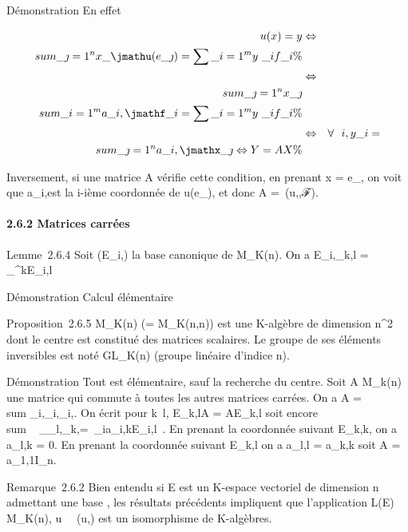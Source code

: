 \documentclass[]{article}
\begin{document}
Démonstration En effet

\begin{align*} u(x) = y&
\Leftrightarrow & \\sum
\_\jmath=1^nx\_ \jmathu(e\_\jmath) =
\sum \_i=1^my~\_
if\_i \%& \\ &
\Leftrightarrow & \\sum
\_\jmath=1^nx\_ \jmath \\sum
\_i=1^ma\_ i,\jmathf\_i =
\sum \_i=1^my~\_
if\_i\%& \\ &
\Leftrightarrow & \forall~~i,
y\_i = \\sum
\_\jmath=1^na\_ i,\jmathx\_\jmath
\Leftrightarrow Y = AX \%&
\\ \end{align*}

Inversement, si une matrice A vérifie cette condition, en prenant x =
e\_\jmath, on voit que a\_i,\jmath est la i-ième coordonnée de
u(e\_\jmath), et donc A =\
\mathrmMat (u,,ℱ).

\paragraph{2.6.2 Matrices carrées}

Lemme~2.6.4 Soit (E\_i,\jmath) la base canonique de M\_K(n).
On a E\_i,\jmathE\_k,l = \delta\_\jmath^kE\_i,l

Démonstration Calcul élémentaire

Proposition~2.6.5 M\_K(n) (= M\_K(n,n)) est une
K-algèbre de dimension n^2 dont le centre est constitué des
matrices scalaires. Le groupe de ses éléments inversibles est noté
GL\_K(n) (groupe linéaire d'indice n).

Démonstration Tout est élémentaire, sauf la recherche du centre. Soit A
\in M\_k(n) une matrice qui commute à toutes les autres matrices
carrées. On a A =\ \\sum
 \_i,\jmatha\_i,\jmathE\_i,\jmath. On écrit pour
k\neq~l, E\_k,lA = AE\_k,l soit
encore \\sum ~
\_\jmatha\_l,\jmathE\_k,\jmath =\
\sum  \_ia\_i,kE\_i,l~. En
prenant la coordonnée suivant E\_k,k, on a a\_l,k = 0.
En prenant la coordonnée suivant E\_k,l on a a\_l,l =
a\_k,k soit A = a\_1,1I\_n.

Remarque~2.6.2 Bien entendu si E est un K-espace vectoriel de dimension
n admettant une base , les résultats précédents impliquent que
l'application L(E) \rightarrow~ M\_K(n),
u\mapsto~\mathrmMat~
(u,\mathcal{E}) est un isomorphisme de K-algèbres.
\end{document}
